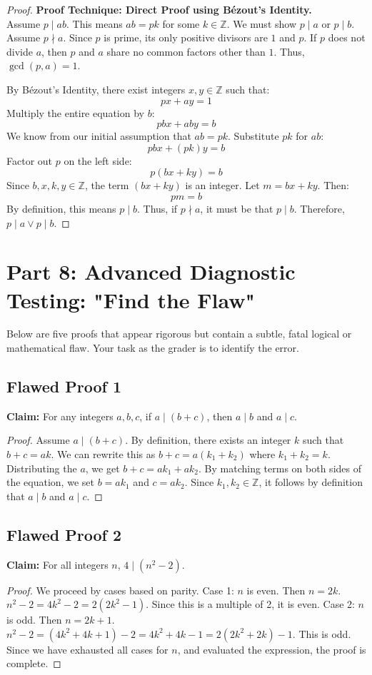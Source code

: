 \documentclass[11pt]{article}
\theoremstyle{definition}
\theoremstyle{remark}
\newcommand{\Z}{\mathbb{Z}}
\begin{document}
\begin{proof}
\textbf{Proof Technique: Direct Proof using Bézout's Identity.} \\
Assume $p \mid ab$. This means $ab = pk$ for some $k \in \Z$.
We must show $p \mid a$ or $p \mid b$. 
Assume $p \nmid a$. Since $p$ is prime, its only positive divisors are $1$ and $p$. If $p$ does not divide $a$, then $p$ and $a$ share no common factors other than $1$. Thus, $\gcd(p, a) = 1$.

By Bézout's Identity, there exist integers $x, y \in \Z$ such that:
\[ px + ay = 1 \]
Multiply the entire equation by $b$:
\[ pbx + aby = b \]
We know from our initial assumption that $ab = pk$. Substitute $pk$ for $ab$:
\[ pbx + (pk)y = b \]
Factor out $p$ on the left side:
\[ p(bx + ky) = b \]
Since $b, x, k, y \in \Z$, the term $(bx + ky)$ is an integer. Let $m = bx + ky$. Then:
\[ pm = b \]
By definition, this means $p \mid b$. 
Thus, if $p \nmid a$, it must be that $p \mid b$. Therefore, $p \mid a \lor p \mid b$.
\end{proof}

\newpage
\section{Part 8: Advanced Diagnostic Testing: "Find the Flaw"}

Below are five proofs that appear rigorous but contain a subtle, fatal logical or mathematical flaw. Your task as the grader is to identify the error.

\subsection{Flawed Proof 1}
\textbf{Claim:} For any integers $a, b, c$, if $a \mid (b+c)$, then $a \mid b$ and $a \mid c$.
\begin{proof}
Assume $a \mid (b+c)$. By definition, there exists an integer $k$ such that $b+c = ak$. We can rewrite this as $b+c = a(k_1 + k_2)$ where $k_1 + k_2 = k$. Distributing the $a$, we get $b+c = ak_1 + ak_2$. By matching terms on both sides of the equation, we set $b = ak_1$ and $c = ak_2$. Since $k_1, k_2 \in \Z$, it follows by definition that $a \mid b$ and $a \mid c$.
\end{proof}

\subsection{Flawed Proof 2}
\textbf{Claim:} For all integers $n$, $4 \mid (n^2 - 2)$.
\begin{proof}
We proceed by cases based on parity. 
Case 1: $n$ is even. Then $n = 2k$. $n^2 - 2 = 4k^2 - 2 = 2(2k^2 - 1)$. Since this is a multiple of 2, it is even.
Case 2: $n$ is odd. Then $n = 2k+1$. $n^2 - 2 = (4k^2 + 4k + 1) - 2 = 4k^2 + 4k - 1 = 2(2k^2 + 2k) - 1$. This is odd.
Since we have exhausted all cases for $n$, and evaluated the expression, the proof is complete.
\end{proof}
\end{document}
